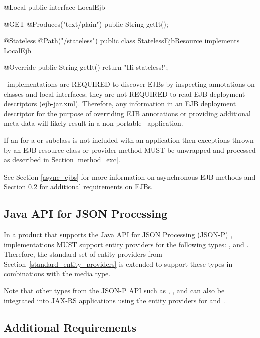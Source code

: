\begin{listing}{1}
@Local
public interface LocalEjb {

    @GET
    @Produces("text/plain")
    public String getIt();
}

@Stateless
@Path("/stateless")
public class StatelessEjbResource implements LocalEjb {

    @Override
    public String getIt() {
        return "Hi stateless!";
    }
}
\end{listing}

\jaxrs\ implementations are REQUIRED to discover EJBs by inspecting annotations on classes and local interfaces; they are not REQUIRED to read EJB deployment descriptors (ejb-jar.xml). Therefore, any information in an EJB deployment descriptor for the purpose of overriding EJB annotations or providing additional meta-data will likely result in a non-portable \jaxrs\ application. 

If an  for a  or subclass is not included with an application then exceptions thrown by an EJB resource class or provider method MUST be unwrapped and processed as described in Section \ref{method_exc}. 

See Section \ref{async_ejbs} for more information on asynchronous EJB methods and Section \ref{additional_reqs} for additional requirements on EJBs.

\subsection{Java API for JSON Processing}
\label{jsonp}

In a product that supports the Java API for JSON Processing (JSON-P) \cite{jsonp}, implementations MUST support entity providers for the following types: ,  and . Therefore, the standard set of entity providers from Section~\ref{standard_entity_providers} is extended to support these types in combinations with the  media type.

Note that other types from the JSON-P API such as , ,  and  can also be integrated into JAX-RS applications using the entity providers for  and . 

\subsection{Additional Requirements}
\label{additional_reqs}

